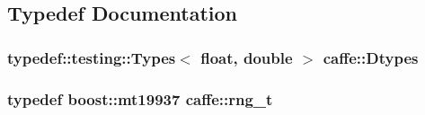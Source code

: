 \subsection{Typedef Documentation}
\hypertarget{namespacecaffe_a131dc2be50f2f10e18450da61cde6b57}{
\subsubsection[{Dtypes}]{\setlength{\rightskip}{0pt plus 5cm}typedef\+::testing\+::\+Types$<$ float, double $>$ {\bf caffe\+::\+Dtypes}}}\label{namespacecaffe_a131dc2be50f2f10e18450da61cde6b57}
\hypertarget{namespacecaffe_aeff0d41eefd30caf64b0c9d03e142af3}{
\subsubsection[{rng\+\_\+t}]{\setlength{\rightskip}{0pt plus 5cm}typedef boost\+::mt19937 {\bf caffe\+::rng\+\_\+t}}}\label{namespacecaffe_aeff0d41eefd30caf64b0c9d03e142af3}


